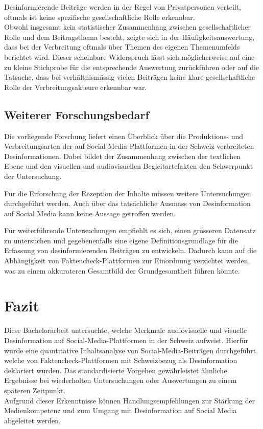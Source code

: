 \documentclass[12pt,a4paper]{article}        %
\begin{document}
Desinformierende Beiträge werden in der Regel von Privatpersonen verteilt, oftmals ist keine spezifische gesellschaftliche Rolle erkennbar. \\
Obwohl insgesamt kein statistischer Zusammenhang zwischen gesellschaftlicher Rolle und dem Beitragsthema besteht, zeigte sich in der Häufigkeitsauswertung, dass bei der Verbreitung oftmals über Themen des eigenen Themenumfelds berichtet wird. Dieser scheinbare Widerspruch lässt sich möglicherweise auf eine zu kleine Stichprobe für die entsprechende Auswertung zurückführen oder auf die Tatsache, dass bei verhältnismässig vielen Beiträgen keine klare gesellschaftliche Rolle der Verbreitungsakteure erkennbar war.

\subsection{Weiterer Forschungsbedarf}
Die vorliegende Forschung liefert einen Überblick über die Produktions- und Verbreitungsarten der auf Social-Media-Plattformen in der Schweiz verbreiteten Desinformationen. Dabei bildet der Zusammenhang zwischen der textlichen Ebene und den visuellen und audiovisuellen Begleitartefakten den Schwerpunkt der Untersuchung.

Für die Erforschung der Rezeption der Inhalte müssen weitere Untersuchungen durchgeführt werden. Auch über das tatsächliche Ausmass von Desinformation auf Social Media kann keine Aussage getroffen werden.

Für weiterführende Untersuchungen empfiehlt es sich, einen grösseren Datensatz zu untersuchen und gegebenenfalls eine eigene Definitionsgrundlage für die Erfassung von desinformierenden Beiträgen zu entwickeln. Dadurch kann auf die Abhängigkeit von Faktencheck-Plattformen zur Einordnung verzichtet werden, was zu einem akkurateren Gesamtbild der Grundgesamtheit führen könnte. 
\pagebreak
\section{Fazit}
Diese Bachelorarbeit untersuchte, welche Merkmale audiovisuelle und visuelle Desinformation auf Social-Media-Plattformen in der Schweiz aufweist. Hierfür wurde eine quantitative Inhaltsanalyse von Social-Media-Beiträgen durchgeführt, welche von Faktencheck-Plattformen mit Schweizbezug als Desinformation deklariert wurden. Das standardisierte Vorgehen gewährleistet ähnliche Ergebnisse bei wiederholten Untersuchungen oder Auswertungen zu einem späteren Zeitpunkt.\\
Aufgrund dieser Erkenntnisse können Handlungsempfehlungen zur Stärkung der Medienkompetenz und zum Umgang mit Desinformation auf Social Media abgeleitet werden.
\end{document}
